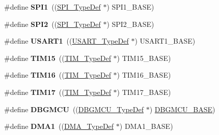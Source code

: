 \begin{DoxyCompactItemize}
\#define {\bfseries S\+P\+I1}~((\hyperlink{struct_s_p_i___type_def}{S\+P\+I\+\_\+\+Type\+Def} $\ast$) S\+P\+I1\+\_\+\+B\+A\+SE)
\item 
\mbox{\label{group___peripheral__declaration_gaf2c3d8ce359dcfbb2261e07ed42af72b}} 
\#define {\bfseries S\+P\+I2}~((\hyperlink{struct_s_p_i___type_def}{S\+P\+I\+\_\+\+Type\+Def} $\ast$) S\+P\+I2\+\_\+\+B\+A\+SE)
\item 
\mbox{\label{group___peripheral__declaration_ga92871691058ff7ccffd7635930cb08da}} 
\#define {\bfseries U\+S\+A\+R\+T1}~((\hyperlink{struct_u_s_a_r_t___type_def}{U\+S\+A\+R\+T\+\_\+\+Type\+Def} $\ast$) U\+S\+A\+R\+T1\+\_\+\+B\+A\+SE)
\item 
\mbox{\label{group___peripheral__declaration_ga87e4b442041d1c03a6af113fbe04a182}} 
\#define {\bfseries T\+I\+M15}~((\hyperlink{struct_t_i_m___type_def}{T\+I\+M\+\_\+\+Type\+Def} $\ast$) T\+I\+M15\+\_\+\+B\+A\+SE)
\item 
\mbox{\label{group___peripheral__declaration_ga73ec606e7dacf17e18c661e8ff8c7c8d}} 
\#define {\bfseries T\+I\+M16}~((\hyperlink{struct_t_i_m___type_def}{T\+I\+M\+\_\+\+Type\+Def} $\ast$) T\+I\+M16\+\_\+\+B\+A\+SE)
\item 
\mbox{\label{group___peripheral__declaration_ga65aea6c8b36439e44ad6cde0e6891aab}} 
\#define {\bfseries T\+I\+M17}~((\hyperlink{struct_t_i_m___type_def}{T\+I\+M\+\_\+\+Type\+Def} $\ast$) T\+I\+M17\+\_\+\+B\+A\+SE)
\item 
\mbox{\label{group___peripheral__declaration_ga92ec6d9ec2251fda7d4ce09748cd74b4}} 
\#define {\bfseries D\+B\+G\+M\+CU}~((\hyperlink{struct_d_b_g_m_c_u___type_def}{D\+B\+G\+M\+C\+U\+\_\+\+Type\+Def} $\ast$) \hyperlink{group___peripheral__memory__map_ga4adaf4fd82ccc3a538f1f27a70cdbbef}{D\+B\+G\+M\+C\+U\+\_\+\+B\+A\+SE})
\item 
\mbox{\label{group___peripheral__declaration_gacc16d2a5937f7585320a98f7f6b578f9}} 
\#define {\bfseries D\+M\+A1}~((\hyperlink{struct_d_m_a___type_def}{D\+M\+A\+\_\+\+Type\+Def} $\ast$) D\+M\+A1\+\_\+\+B\+A\+SE)

\end{DoxyCompactItemize}
